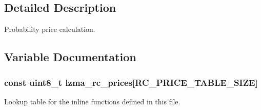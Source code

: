 \subsection{Detailed Description}
Probability price calculation. 

\subsection{Variable Documentation}
\subsubsection[{lzma\-\_\-rc\-\_\-prices}]{\setlength{\rightskip}{0pt plus 5cm}const uint8\-\_\-t lzma\-\_\-rc\-\_\-prices[R\-C\-\_\-\-P\-R\-I\-C\-E\-\_\-\-T\-A\-B\-L\-E\-\_\-\-S\-I\-Z\-E]}\label{price_8h_ab6ce95bec016604493ae528e847554aa}


Lookup table for the inline functions defined in this file. 

